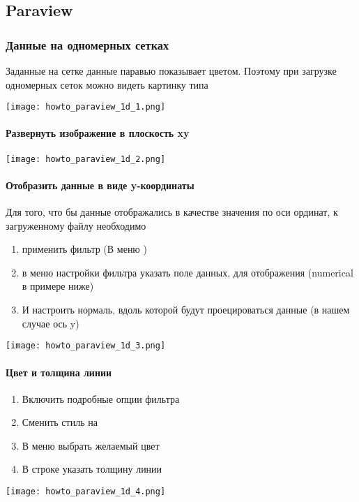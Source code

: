\subsection{Paraview}

\subsubsection{Данные на одномерных сетках}
\label{sec:paraview-1d}

Заданные на сетке данные паравью показывает цветом.
Поэтому при загрузке одномерных сеток можно видеть картинку типа
\begin{center}
\texttt{[image: howto\_paraview\_1d\_1.png]}
\end{center}
\paragraph{Развернуть изображение в плоскость xy}
\begin{center}
\texttt{[image: howto\_paraview\_1d\_2.png]}
\end{center}
\paragraph{Отобразить данные в виде y-координаты} Для того, что бы данные отображались в качестве значения по оси ординат, к загруженному файлу необходимо
\begin{enumerate}
\item применить фильтр  (В меню )
\item в меню настройки фильтра указать поле данных, для отображения (numerical в примере ниже)
\item И настроить нормаль, вдоль которой будут проецироваться данные (в нашем случае ось y)
\end{enumerate}
\begin{center}
\texttt{[image: howto\_paraview\_1d\_3.png]}
\end{center}

\paragraph{Цвет и толщина линии}
\begin{enumerate}
\item Включить подробные опции фильтра
\item Сменить стиль на 
\item В меню  выбрать желаемый цвет
\item В строке  указать толщину линии
\end{enumerate}
\begin{center}
\texttt{[image: howto\_paraview\_1d\_4.png]}
\end{center}

